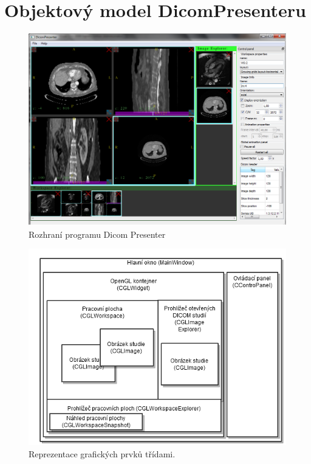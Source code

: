 \section*{Objektový model DicomPresenteru}
\begin{figure}
	\begin{center}
	\includegraphics[width=130mm]{Text/IMG/04_GUI_Screenshot.png}
	\end{center}
	\caption{Rozhraní programu Dicom Presenter}
	\label{screenshotDP}
\end{figure}

\begin{figure}
	\begin{center}
	\includegraphics[width=130mm]{Text/IMG/04_GUI.png}
	\end{center}
	\caption{Reprezentace grafických prvků třídami.}
\end{figure}
